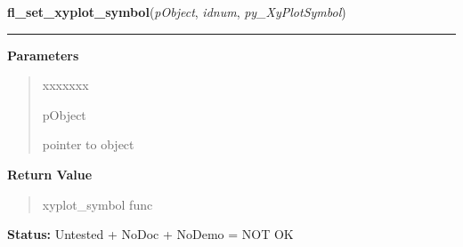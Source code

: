 \hspace{.8\funcindent}\begin{boxedminipage}{\funcwidth}

    \raggedright \textbf{fl\_set\_xyplot\_symbol}(\textit{pObject}, \textit{idnum}, \textit{py\_XyPlotSymbol})

    \vspace{-1.5ex}

    \rule{\textwidth}{0.5\fboxrule}
\setlength{\parskip}{2ex}
\setlength{\parskip}{1ex}
      \textbf{Parameters}
      \vspace{-1ex}

      \begin{quote}
        \begin{Ventry}{xxxxxxx}

          \item[pObject]

          pointer to object

        \end{Ventry}

      \end{quote}

      \textbf{Return Value}
    \vspace{-1ex}

      \begin{quote}
      xyplot\_symbol func

      \end{quote}

\textbf{Status:} Untested + NoDoc + NoDemo = NOT OK



    \end{boxedminipage}

    \label{xformslib:library:fl_set_xyplot_mark_active}

    \vspace{0.5ex}

